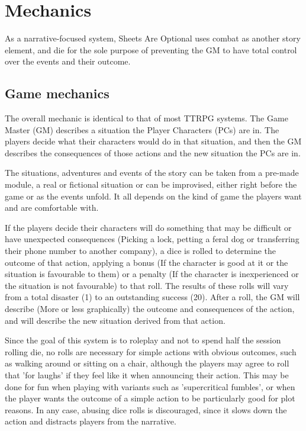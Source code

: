 \chapter{Mechanics}

As a narrative-focused system, Sheets Are Optional uses combat as another story element, and die for the sole purpose of preventing the GM to have total control over the events and their outcome. 

\section{Game mechanics}

The overall mechanic is identical to that of most TTRPG systems. The Game Master (GM) describes a situation the Player Characters (PCs) are in. The players decide what their characters would do in that situation, and then the GM describes the consequences of those actions and the new situation the PCs are in.

The situations, adventures and events of the story can be taken from a pre-made module, a real or fictional situation or can be improvised, either right before the game or as the events unfold. It all depends on the kind of game the players want and are comfortable with.

If the players decide their characters will do something that may be difficult or have unexpected consequences (Picking a lock, petting a feral dog or transferring their phone number to another company), a dice is rolled to determine the outcome of that action, applying a bonus (If the character is good at it or the situation is favourable to them) or a penalty (If the character is inexperienced or the situation is not favourable) to that roll. The results of these rolls will vary from a total disaster (1) to an outstanding success (20). After a roll, the GM will describe (More or less graphically) the outcome and consequences of the action, and will describe the new situation derived from that action.

Since the goal of this system is to roleplay and not to spend half the session rolling die, no rolls are necessary for simple actions with obvious outcomes, such as walking around or sitting on a chair, although the players may agree to roll that 'for laughs' if they feel like it when announcing their action. This may be done for fun when playing with variants such as 'supercritical fumbles', or when the player wants the outcome of a simple action to be particularly good for plot reasons. In any case, abusing dice rolls is discouraged, since it slows down the action and distracts players from the narrative.

